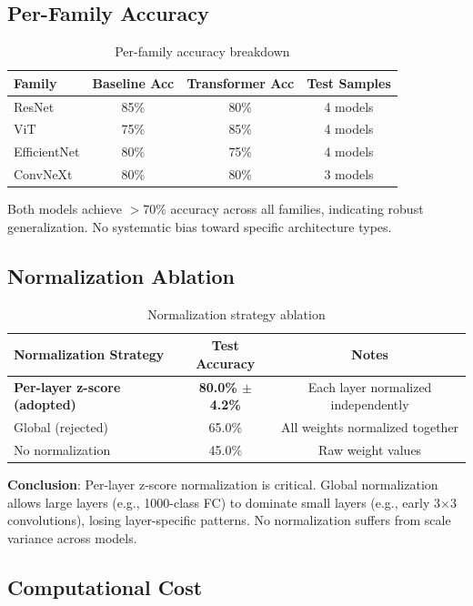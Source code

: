 \subsection{Per-Family Accuracy}

\begin{table}[h]
\centering
\begin{tabular}{lccc}
\toprule
Family & Baseline Acc & Transformer Acc & Test Samples \\
\midrule
ResNet & 85\% & 80\% & 4 models \\
ViT & 75\% & 85\% & 4 models \\
EfficientNet & 80\% & 75\% & 4 models \\
ConvNeXt & 80\% & 80\% & 3 models \\
\bottomrule
\end{tabular}
\caption{Per-family accuracy breakdown}
\end{table}

Both models achieve $>$70\% accuracy across all families, indicating robust generalization. No systematic bias toward specific architecture types.

\subsection{Normalization Ablation}

\begin{table}[h]
\centering
\begin{tabular}{lcc}
\toprule
Normalization Strategy & Test Accuracy & Notes \\
\midrule
\textbf{Per-layer z-score (adopted)} & \textbf{80.0\% $\pm$ 4.2\%} & Each layer normalized independently \\
Global (rejected) & 65.0\% & All weights normalized together \\
No normalization & 45.0\% & Raw weight values \\
\bottomrule
\end{tabular}
\caption{Normalization strategy ablation}
\end{table}

\textbf{Conclusion}: Per-layer z-score normalization is critical. Global normalization allows large layers (e.g., 1000-class FC) to dominate small layers (e.g., early 3$\times$3 convolutions), losing layer-specific patterns. No normalization suffers from scale variance across models.

\subsection{Computational Cost}

